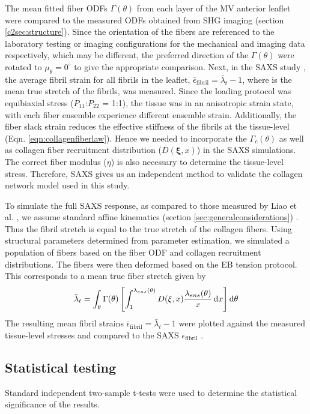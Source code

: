     The mean fitted fiber ODFs $\Gamma(\theta)$ from each layer of the MV anterior leaflet were compared to the measured ODFs obtained from SHG imaging (section \ref{c2sec:structure}). Since the orientation of the fibers are referenced to the laboratory testing or imaging configurations for the mechanical and imaging data respectively, which may be different, the preferred direction of the $\Gamma(\theta)$ were rotated to $\mu_\theta = 0^\circ$ to give the appropriate comparison. Next, in the SAXS study \cite{liao_relation_2007}, the average fibril strain for all fibrils in the leaflet, $\bar{\epsilon}_\mathrm{fibril} = \bar{\lambda}_t - 1$, where  is the mean true stretch of the fibrils, was measured. Since the loading protocol was equibiaxial stress ($P_{11}$:$P_{22}$ = 1:1), the tissue was in an anisotropic strain state, with each fiber ensemble experience different ensemble strain. Additionally, the fiber slack strain reduces the effective stiffness of the fibrils at the tissue-level (Eqn. \ref{eqn:collagenfiberlaw}). Hence we needed to incorporate the $\Gamma_c(\theta)$ as well as collagen fiber recruitment distribution ($D(\mathbf{\xi}, x)$) in the SAXS simulations. The correct fiber modulus ($\eta$) is also necessary to determine the tissue-level stress. Therefore, SAXS gives us an independent method to validate the collagen network model used in this study.
    
    
    To simulate the full SAXS response, as compared to those measured by Liao et al. \cite{liao_relation_2007}, we assume standard affine kinematics (section \ref{sec:generalconsiderations}) \cite{lee_presence_2015}. Thus the fibril stretch is equal to the true stretch of the collagen fibers. Using structural parameters determined from parameter estimation, we simulated a population of fibers based on the fiber ODF and collagen recruitment distributions. The fibers were then deformed based on the EB tension protocol. This corresponds to a mean true fiber stretch given by
        \begin{equation}\label{c2:eqn:fibrilstrain}
        \begin{aligned}
        \bar{\lambda}_t = \int_\theta\Gamma(\theta)\left[\int_1^{\lambda_{ens}(\theta)}D(\mathbf{\xi},x)\frac{\lambda_{ens}(\theta)}{x}\dif x\right]\dif \theta
        \end{aligned}
        \end{equation}
    The resulting mean fibril strains $\bar{\epsilon}_\mathrm{fibril} = \bar{\lambda}_t-1$ were plotted against the measured tissue-level stresses and compared to the SAXS $\epsilon_\mathrm{fibril}$ \cite{liao_relation_2007}.


\subsection{Statistical testing}

    Standard independent two-sample t-tests were used to determine the statistical significance of the results.



    
    
    
    